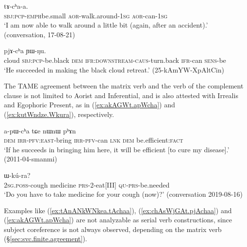 \begin{exe}
\ex \label{ex:tAnANkWNkea.tAchaa}
  tɤ-cʰa-a. \\
 \textsc{sbj}:\textsc{pcp}-\textsc{emph}\redp{}be.small \textsc{aor}-walk.around-\textsc{1sg} \textsc{aor}-can-\textsc{1sg} \\
 \glt `I am now able to walk around a little bit (again, after an accident).' (conversation, 17-08-21)
\end{exe}

\begin{exe}
\ex \label{ex:chAsWjGAt.pjAchaa}
  pjɤ-cʰa ɲɯ-ŋu. \\
 cloud \textsc{sbj}:\textsc{pcp}-be.black \textsc{dem} \textsc{ifr}:\textsc{downstream}-\textsc{caus}-turn.back \textsc{ifr}-can \textsc{sens}-be \\
 \glt `He succeeded in making the black cloud retreat.' (25-kAmYW-XpAltCin)
 \end{exe}
 
The TAME agreement between the matrix verb and the verb of the complement clause is not limited to Aorist and Inferential, and is also attested with Irrealis and Egophoric Present, as in (\ref{ex:akAGWt.apWcha}) and (\ref{ex:kutWndze.Wkura}), respectively.

\begin{exe}
\ex \label{ex:akAGWt.apWcha}
  a-pɯ-cʰa tɕe nɯnɯ pʰɤn \\
 \textsc{dem} \textsc{irr}-\textsc{pfv}:\textsc{east}-bring \textsc{irr}-\textsc{pfv}-can \textsc{lnk} \textsc{dem} be.efficient:\textsc{fact} \\
 \glt `If he succeeds in bringing him here, it will be efficient [to cure my disease].' (2011-04-smanmi)
 \end{exe}
 
\begin{exe}
\ex \label{ex:kutWndze.Wkura}
  ɯ-kú-ra? \\
 \textsc{2sg}.\textsc{poss}-cough medicine \textsc{prs}-2-eat[III] \textsc{qu}-\textsc{prs}-be.needed \\
 \glt `Do you have to take medicine for your cough (now)?' (conversation 2019-08-16)
 \end{exe} 
 
 Examples like (\ref{ex:tAnANkWNkea.tAchaa}), (\ref{ex:chAsWjGAt.pjAchaa}) and (\ref{ex:akAGWt.apWcha}) are not analyzable as serial verb constructions, since subject coreference is not always observed, depending on the matrix verb (§\ref{sec:svc.finite.agreement}).
 
